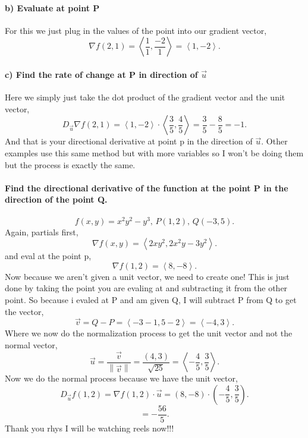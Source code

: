 \documentclass{report}
\begin{document}
\begin{multicols}{2}
\paragraph{b) Evaluate at point P}
For this we just plug in the values of the point into our gradient vector,
\[
\nabla f\left( 2,1 \right) = \left< \frac{ 1 }{ 1 } , \frac{ -2 }{ 1 } \right> = \left<1,-2 \right>
.\] 
\paragraph{c) Find the rate of change at P in direction of $ \vec{ u } $}
Here we simply just take the dot product of the gradient vector and the unit vector,
\[
D_{ \vec{ u } }\nabla f\left( 2,1 \right) = \left< 1,-2 \right> \cdot \left< \frac{ 3 }{ 5 } , \frac{ 4 }{ 5 }  \right> = \frac{ 3 }{ 5 } -\frac{ 8 }{ 5 } = -1
.\] 
And that is your directional derivative at point p in the direction of $ \vec{ u } $. Other examples use this same method but with more variables so I won't be doing them but the process is exactly the same. 

\paragraph{Find the directional derivative of the function at the point P in the direction of the point Q.}
\[
f\left( x,y \right) = x^2y^2 - y^3\text{, }P\left( 1,2 \right) \text{, }Q\left( -3,5 \right) 
.\] 
Again, partials first,
\[
\nabla f\left( x,y \right) = \left< 2xy^2, 2x^2y - 3y^2 \right>
.\] 
and eval at the point p,
\[
\nabla f\left( 1,2 \right) = \left<8,-8 \right>
.\] 
Now because we aren't given a unit vector, we need to create one! This is just done by taking the point you are evaling at and subtracting it from the other point. So because i evaled at P and am given Q, I will subtract P from Q to get the vector,
\[
\vec{ v }= Q - P = \left< -3-1, 5-2 \right> = \left< -4,3 \right>
.\] 
Where we now do the normalization process to get the unit vector and not the normal vector,
\[
\vec{ u }= \frac{ \vec{ v } }{ \left\| \vec{ v } \right\| }= \frac{ \left( 4,3 \right)  }{ \sqrt{ 25 }  }= \left< -\frac{ 4 }{ 5 } , \frac{ 3 }{ 5 }  \right>
.\] 
Now we do the normal process because we have the unit vector,
\[
D_{ \vec{ u } }f\left( 1,2 \right) = \nabla f\left( 1,2 \right) \cdot \vec{ u } = \left( 8,-8 \right) \cdot \left( -\frac{ 4 }{ 5 } ,\frac{ 3 }{ 5 }  \right) 
.\] 
\[
= -\frac{ 56 }{ 5 } 
.\] 
Thank you rhys I will be watching reels now!!!
\end{multicols}
\end{document}
